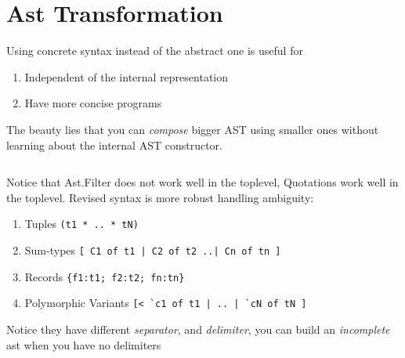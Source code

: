 \section{Ast Transformation}
  
Using concrete syntax instead of the abstract one is useful for
\begin{enumerate}
\item Independent of the internal representation 
\item Have more concise programs
\end{enumerate}

The beauty lies that you can \textit{compose} bigger AST using smaller
ones without learning about the internal AST constructor.

\inputminted[fontsize=\scriptsize,]{ocaml}{code/camlp4/compose/compose.ml}

Notice that Ast.Filter does not work well in the toplevel, Quotations
work well in the toplevel. Revised syntax is more robust handling
ambiguity:

\begin{enumerate}
  \item  Tuples \verb|(t1 * .. * tN)|
   \item Sum-types \verb/[ C1 of t1 | C2 of t2 ..| Cn of tn ]/
   \item Records  \verb|{f1:t1; f2:t2; fn:tn}|
   \item Polymorphic Variants \verb/[< `c1 of t1 | .. | `cN of tN ]/
\end{enumerate}

Notice they have different \textit{separator}, and \textit{delimiter},
you can build an \textit{incomplete} ast when you have no delimiters

